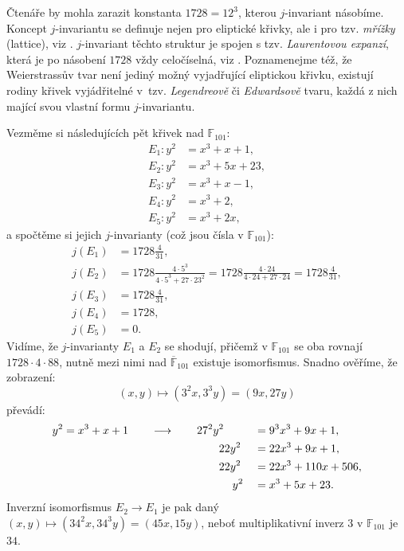 \documentclass[12pt]{report}
\begin{document}
\begin{poznamka}
Čtenáře by mohla zarazit konstanta $1728 = 12^3$, kterou $j$-invariant násobíme. Koncept $j$-invariantu se definuje nejen pro eliptické křivky, ale i pro tzv. \textit{mřížky} (lattice), viz \cite[Def. 16.2]{Sutherland}. $j$-invariant těchto struktur je spojen s tzv. \textit{Laurentovou expanzí}, která je po násobení $1728$ vždy celočíselná, viz \cite[Ch. 11]{Cox}. Poznamenejme též, že Weierstrassův tvar není jediný možný vyjadřující eliptickou křivku, existují rodiny křivek vyjádřitelné v~tzv. \textit{Legendreově} či \textit{Edwardsově} tvaru, každá z nich mající svou vlastní formu $j$-invariantu. 
\end{poznamka}
\begin{priklad}
Vezměme si následujících pět křivek nad $\mathbb{F}_{101}$:
\begin{align*}
E_1 : y^2 &= x^3+x+1,\\
E_2 : y^2 &= x^3+5x+23,\\
E_3 : y^2 &= x^3+x-1,\\
E_4 : y^2 &= x^3+2,\\
E_5 : y^2 &= x^3+2x,
\end{align*}
a spočtěme si jejich $j$-invarianty (což jsou čísla v $\mathbb{F}_{101}$):
\begin{align*}
j(E_1) &= 1728 \frac{4}{31},\\
j(E_2) &= 1728 \frac{4 \cdot 5^3}{4 \cdot 5^3+27 \cdot 23^2} = 1728 \frac{4 \cdot 24}{4 \cdot 24 + 27 \cdot 24} = 1728 \frac{4}{31},\\
j(E_3) &= 1728 \frac{4}{31},\\
j(E_4) &= 1728,\\
j(E_5) &= 0.
\end{align*}
Vidíme, že $j$-invarianty $E_1$ a $E_2$ se shodují, přičemž v $\mathbb{F}_{101}$ se oba rovnají $1728 \cdot 4 \cdot 88$, nutně mezi nimi nad $\overline{\mathbb{F}}_{101}$ existuje isomorfismus. Snadno ověříme, že zobrazení:
\begin{equation*}
(x,y) \longmapsto (3^2 x, 3^3 y) = (9x,27y) 
\end{equation*}
převádí:
\begin{alignat*}{3}
y^2 &= x^3+x+1 \qquad \longrightarrow \qquad 27^2 y^2&&= 9^3 x^3 + 9x + 1,\\
&\qquad \hspace*{4.225cm}  22y^2&&= 22 x^3 + 9x + 1,\\
&\qquad \hspace*{4.225cm} 22y^2&&= 22 x^3 + 110x + 506,\\
&\qquad \hspace*{4.65cm} y^2&&= x^3 + 5x + 23.
\end{alignat*}
Inverzní isomorfismus $E_2 \longrightarrow E_1$ je pak daný $(x,y) \mapsto (34^2 x, 34^3 y) = (45x,15y)$, neboť multiplikativní inverz $3$ v $\mathbb{F}_{101}$ je $34$.


\end{priklad}
\end{document}
